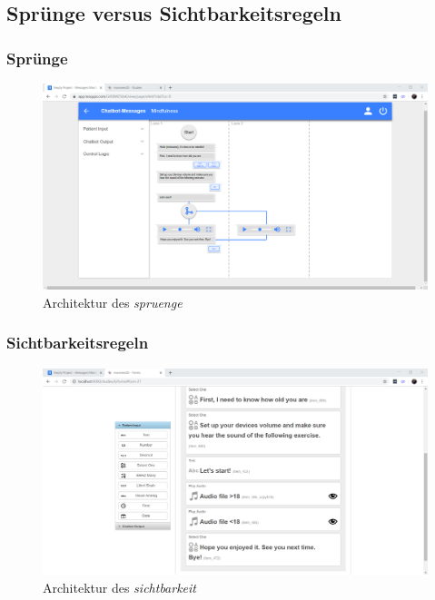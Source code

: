 \subsection{Sprünge versus Sichtbarkeitsregeln}

\subsubsection{Sprünge}
\begin{figure}[!h]
\centering
\includegraphics[width=1\textwidth]{pictures/spruenge}
\caption{Architektur des \emph{spruenge}}
\label{spruenge}
\end{figure}


\subsubsection{Sichtbarkeitsregeln}

\begin{figure}[!h]
\centering
\includegraphics[width=1\textwidth]{pictures/sichtbarkeit}
\caption{Architektur des \emph{sichtbarkeit}}
\label{sichtbarkeit}
\end{figure}


